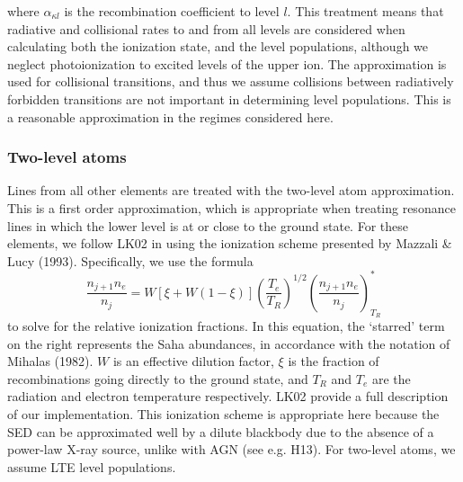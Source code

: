 \documentclass[preprint, a4paper, 11pt]{aastex}
\begin{document}
{where $\alpha_{\kappa l}$ is the recombination
coefficient to level $l$. 
This treatment means that radiative and collisional rates to and from all 
levels are considered when calculating both the ionization state, and the level populations, 
although we neglect photoionization to excited levels of the upper ion. 
The \cite{vanregemorter} approximation is used for collisional transitions,
and thus we assume collisions between radiatively forbidden transitions are
not important in determining level populations.
This is a reasonable approximation in the regimes considered here.

\subsubsection{Two-level atoms}

Lines from all other elements are treated with the two-level atom approximation. 
This is a first order approximation, which is appropriate 
when treating resonance lines in which the lower level is at or close to the 
ground state. 
For these elements, we follow LK02 in using the ionization scheme presented by Mazzali \& Lucy (1993). 
Specifically, we use the formula
\begin{equation}
\frac{n_{j+1} n_e}{n_j} = W [\xi + W(1-\xi)]
\left(\frac{T_e}{T_R}\right)^{1/2}
\left(\frac{n_{j+1}n_e}{n_j}\right)^*_{T_R} \label{ionization}
\end{equation}
to solve for the relative ionization fractions. In this equation, the `starred' term on 
the right represents the Saha abundances, in accordance with the notation of Mihalas (1982). 
$W$ is an effective dilution factor, $\xi$ is the
fraction of recombinations going directly to the ground state, and
$T_R$ and $T_e$ are the radiation and electron temperature
respectively. LK02 provide a full description of our implementation.
This ionization scheme is appropriate here because
the SED can be approximated well by a dilute blackbody due to the 
absence of a power-law X-ray source, unlike with AGN (see e.g. H13).
For two-level atoms, we assume LTE level populations.



}
\end{document}
